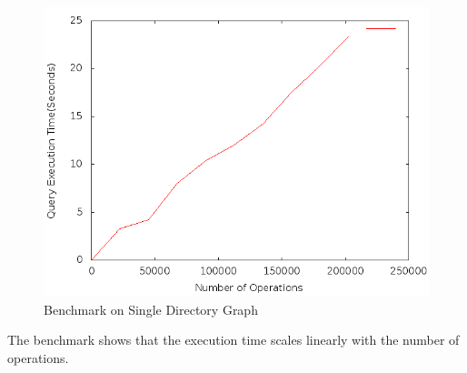 \begin{figure}[tbh]
\centering  
 \includegraphics[scale=0.5]{figs/preliminar/benchmark_graph2.png}
  \caption{Benchmark on Single Directory Graph}
  \label{fig:benchmark_graph2}
\end{figure}

The benchmark shows that the execution time scales linearly with the number of operations.









